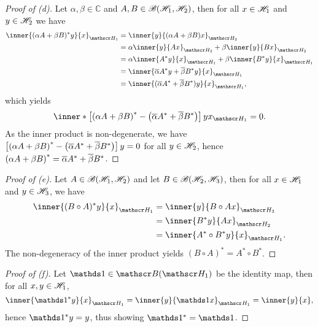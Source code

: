 \begin{proof}[Proof of (d)]
    Let \(\alpha, \beta \in \mathbb{C}\) and \(A, B \in \mathscr{B}(\mathscr{H}_1, \mathscr{H}_2)\), then for all \(x \in \mathscr{H}_1\) and \(y \in \mathscr{H}_2\) we have
    \begin{align*}
        \inner{(\alpha A + \beta B)^*y}{x}_{\hilbert_1} &= \inner{y}{(\alpha A + \beta B)x}_{\hilbert_2}\\
                                                        &= \alpha\inner{y}{Ax}_{\hilbert_2} + \beta\inner{y}{Bx}_{\hilbert_2}\\
                                                        &= \alpha \inner{A^*y}{x}_{\hilbert_1} + \beta \inner{B^*y}{x}_{\hilbert_1}\\
                                                        &= \inner{\conj{\alpha}A^*y + \conj{\beta}B^*y}{x}_{\hilbert_1}\\
                                                        &= \inner{(\conj{\alpha}A^* + \conj{\beta}B^*)y}{x}_{\hilbert_1},
    \end{align*}
    which yields
    \begin{equation*}
        \inner*{\left[\left(\alpha A + \beta B\right)^* - \left(\conj{\alpha}A^* + \conj{\beta}B^*\right)\right]y}{x}_{\hilbert_1} = 0.
    \end{equation*}
    As the inner product is non-degenerate, we have \(\left[\left(\alpha A + \beta B\right)^* - \left(\overline{\alpha}A^* + \overline{\beta}B^*\right)\right]y = 0\) for all \(y \in \mathscr{H}_2\), hence \(\left(\alpha A + \beta B\right)^* = \overline{\alpha}A^* + \overline{\beta}B^*\).
\end{proof}
\begin{proof}[Proof of (e)]
    Let \(A \in \mathscr{B}(\mathscr{H}_1, \mathscr{H}_2)\) and let \(B \in \mathscr{B}(\mathscr{H}_2, \mathscr{H}_3)\), then for all \(x \in \mathscr{H}_1\) and \(y \in \mathscr{H}_3\), we have
    \begin{align*}
        \inner{(B\circ A)^*y}{x}_{\hilbert_1} &= \inner{y}{B \circ Ax}_{\hilbert_3}\\
                                              &= \inner{B^*y}{Ax}_{\hilbert_2}\\
                                              &= \inner{A^* \circ B^*y}{x}_{\hilbert_1}.
    \end{align*}
    The non-degeneracy of the inner product yields \((B \circ A)^* = A^* \circ B^*\).
\end{proof}
\begin{proof}[Proof of (f)]
    Let \(\unity \in \bounded(\hilbert_1)\) be the identity map, then for all \(x, y \in \mathscr{H}_1\),
    \begin{equation*}
        \inner{\unity^*y}{x}_{\hilbert_1} = \inner{y}{\unity x}_{\hilbert_1} = \inner{y}{x},
    \end{equation*}
    hence \(\unity^*y = y\), thus showing \(\unity^* = \unity\).
\end{proof}
